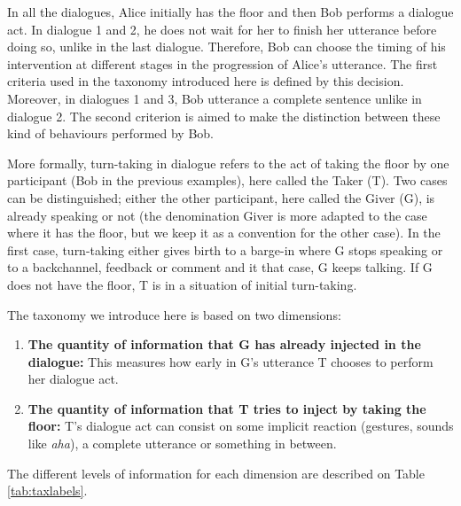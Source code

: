         In all the dialogues, Alice initially has the floor and then Bob performs a dialogue act. In dialogue 1 and 2, he does not wait for her to finish her utterance before doing so, unlike in the last dialogue. Therefore, Bob can choose the timing of his intervention at different stages in the progression of Alice's utterance. The first criteria used in the taxonomy introduced here is defined by this decision. Moreover, in dialogues 1 and 3, Bob utterance a complete sentence unlike in dialogue 2. The second criterion is aimed to make the distinction between these kind of behaviours performed by Bob.

	More formally, turn-taking in dialogue refers to the act of taking the floor by one participant (Bob in the previous examples), here called the Taker (T). Two cases can be distinguished; either the other participant, here called the Giver (G), is already speaking or not (the denomination Giver is more adapted to the case where it has the floor, but we keep it as a convention for the other case). In the first case, turn-taking either gives birth to a barge-in where G stops speaking or to a backchannel, feedback or comment and it that case, G keeps talking. If G does not have the floor, T is in a situation of initial turn-taking.
    
    The taxonomy we introduce here is based on two dimensions:

    \begin{enumerate}
      \item \textbf{The quantity of information that G has already injected in the dialogue:} This measures how early in G's utterance T chooses to perform her dialogue act.
      \item \textbf{The quantity of information that T tries to inject by taking the floor:} T's dialogue act can consist on some implicit reaction (gestures, sounds like \textit{aha}), a complete utterance or something in between.
    \end{enumerate}

    The different levels of information for each dimension are described on Table \ref{tab:taxlabels}.
    
